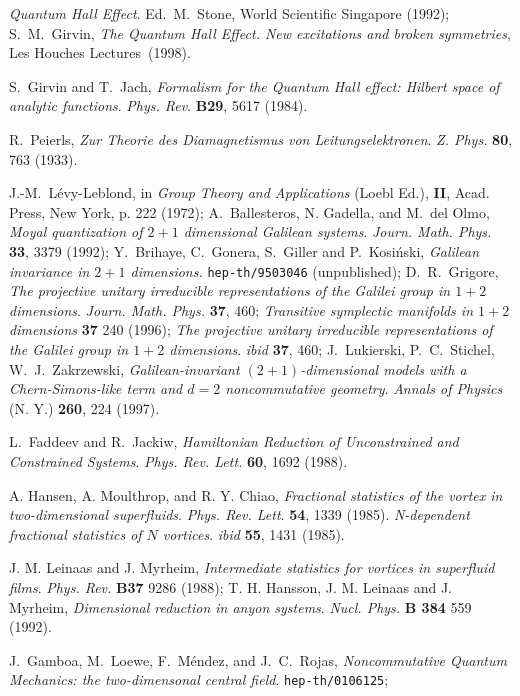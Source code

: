 \documentclass[a4paper,11pt]{article}
\begin{document}
\begin{thebibliography}{99}
  {\it Quantum Hall Effect}.
Ed.~M.~Stone, World Scientific Singapore (1992);
S.~M.~Girvin,  {\it The Quantum Hall Effect.
New excitations and broken symmetries},
Les Houches Lectures~(1998).

S.~Girvin and T.~Jach,
{\it Formalism for the Quantum Hall effect: Hilbert space of
analytic functions}.
{\sl Phys. Rev}. {\bf B29}, 5617 (1984).

R.~Peierls,
{\it Zur Theorie des Diamagnetismus von Leitungselektronen}.
{\sl Z. Phys.} {\bf 80}, 763 (1933).

J.-M.~L\'evy-Leblond,
in {\it Group Theory and Applications} (Loebl Ed.),
{\bf II}, Acad. Press, New York, p. 222 (1972);
A.~Ballesteros, N. Gadella, and M.~del Olmo,
{\it Moyal quantization of $2+1$ dimensional
   Galilean systems}.
  {\sl Journ. Math. Phys.} {\bf 33}, 3379 (1992);
Y.~Brihaye, C.~Gonera, S.~Giller and P.~Kosi\'nski,
  {\it Galilean invariance in $2+1$ dimensions.}
\texttt {hep-th/9503046} (unpublished);
D.~R.~Grigore,
  {\it The projective unitary irreducible representations of the
  Galilei group in $1+2$ dimensions}.
  {\sl Journ. Math. Phys.} {\bf 37}, 460;
  {\it Transitive symplectic manifolds in $1+2$ dimensions}
   {\bf 37} 240 (1996);
   {\it The projective unitary irreducible representations of the
  Galilei group in $1+2$ dimensions}. {\sl ibid} {\bf 37}, 460;
J.~Lukierski, P.~C.~Stichel, W.~J.~Zakrzewski,
   {\it Galilean-invariant $(2+1)$-dimensional models with a
     Chern-Simons-like term and $d=2$ noncommutative geometry}.
  {\sl Annals of Physics}  (N. Y.) {\bf 260}, 224 (1997).

L.~Faddeev and R.~Jackiw,
{\it Hamiltonian Reduction of
Unconstrained and Constrained Systems}.
{\sl Phys. Rev. Lett.} {\bf 60}, 1692 (1988).

A. Hansen, A. Moulthrop, and R. Y. Chiao,
{\it Fractional statistics of the vortex in two-dimensional superfluids}.
{\sl Phys. Rev. Lett}. {\bf 54}, 1339 (1985).
{\it N-dependent fractional statistics of $N$ vortices}.
{\sl ibid} {\bf 55}, 1431 (1985).

J. M. Leinaas and J. Myrheim,
{\it Intermediate statistics for vortices in superfluid films}.
{\sl Phys. Rev.} {\bf B37}  9286 (1988);
  T. H. Hansson, J. M. Leinaas and J. Myrheim,
{\it Dimensional reduction in anyon systems}.
{\sl Nucl. Phys.} {\bf B 384}  559 (1992).

J.~Gamboa, M.~Loewe, F.~M\'endez, and J.~C.~Rojas,
{\it Noncommutative Quantum Mechanics: the two-dimensonal central
field}. \texttt{hep-th/0106125};


\end{thebibliography}
\end{document}
